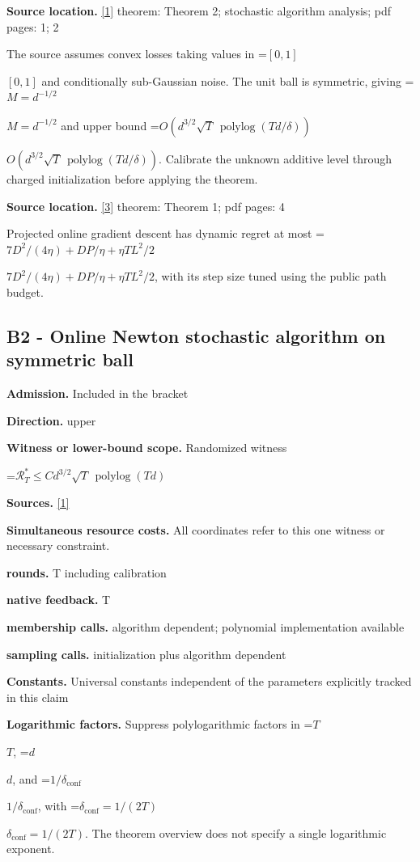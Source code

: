 \documentclass[10pt,a4paper]{article}
\newcommand{\AtlasMath}[1]{\par\begingroup\centering\setbox0=\hbox{$\displaystyle #1$}\ifdim\wd0>1.4\linewidth\typeout{ATLAS WIDE FORMULA: \the\wd0}\fi\ifdim\wd0>\linewidth\resizebox{\linewidth}{!}{\box0}\else\box0\fi\par\endgroup}
\newcommand{\AtlasInlineMath}[1]{\begingroup\setbox0=\hbox{$#1$}\ifdim\wd0>.4\linewidth\endgroup\AtlasMath{#1}\else\endgroup$#1$\fi}
\begin{document}
\textbf{Source location.} \href{https://arxiv.org/pdf/2406.06506v1}{[1]} theorem: Theorem 2; stochastic algorithm analysis; pdf pages: 1; 2

The source assumes convex losses taking values in \AtlasInlineMath{[0,1]} and conditionally sub-Gaussian noise. The unit ball is symmetric, giving \AtlasInlineMath{M=d^{-1/2}} and upper bound \AtlasInlineMath{O(d^{3/2}\sqrt T\,\operatorname{polylog}(Td/\delta))}. Calibrate the unknown additive level through charged initialization before applying the theorem.

\textbf{Source location.} \href{https://www.lamda.nju.edu.cn/lusy/pdf/zhang2018adaptive.pdf}{[3]} theorem: Theorem 1; pdf pages: 4

Projected online gradient descent has dynamic regret at most \AtlasInlineMath{7D^2/(4\eta)+DP/\eta+\eta TL^2/2}, with its step size tuned using the public path budget.

\subsection{B2 - Online Newton stochastic algorithm on symmetric ball}
\textbf{Admission.} Included in the bracket

\textbf{Direction.} upper

\textbf{Witness or lower-bound scope.} Randomized witness

\AtlasMath{\mathcal{R}_T^*\le C d^{3/2}\sqrt T\,\operatorname{polylog}(Td)}
\textbf{Sources.} \href{https://arxiv.org/pdf/2406.06506v1}{[1]}

\textbf{Simultaneous resource costs.} All coordinates refer to this one witness or necessary constraint.

\textbf{rounds.} T including calibration

\textbf{native feedback.} T

\textbf{membership calls.} algorithm dependent; polynomial implementation available

\textbf{sampling calls.} initialization plus algorithm dependent

\textbf{Constants.} Universal constants independent of the parameters explicitly tracked in this claim

\textbf{Logarithmic factors.} Suppress polylogarithmic factors in \AtlasInlineMath{T}, \AtlasInlineMath{d}, and \AtlasInlineMath{1/\delta_{\mathrm{conf}}}, with \AtlasInlineMath{\delta_{\mathrm{conf}}=1/(2T)}. The theorem overview does not specify a single logarithmic exponent.
\end{document}
